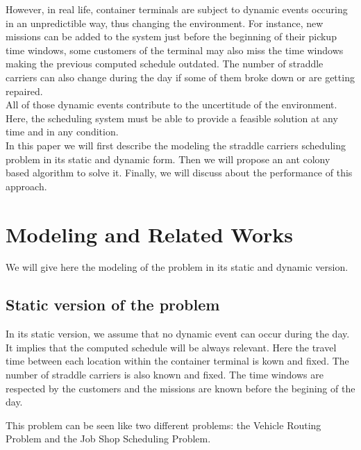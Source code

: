 \documentclass[a4paper,10pt]{article}
\begin{document}
However, in real life, container terminals are subject to dynamic events occuring in an unpredictible way, thus changing the environment. For instance, new missions can be added to the system just before the beginning of their pickup time windows, some customers of the terminal may also miss the time windows making the previous computed schedule outdated. The number of straddle carriers can also change during the day if some of them broke down or are getting repaired.\\

All of those dynamic events contribute to the uncertitude of the environment. Here, the scheduling system must be able to provide a feasible solution at any time and in any condition.\\


In this paper we will first describe the modeling the straddle carriers scheduling problem in its static and dynamic form. Then we will propose an ant colony based algorithm to solve it. Finally, we will discuss about the performance of this approach.

\section{Modeling and Related Works}

We will give here the modeling of the problem in its static and dynamic version.

    \subsection{Static version of the problem}

In its static version, we assume that no dynamic event can occur during the day. It implies that the computed schedule will be always relevant. Here the travel time between each location within the container terminal is kown and fixed. The number of straddle carriers is also known and fixed. The time windows are respected by the customers and the missions are known before the begining of the day.

This problem can be seen like two different problems: the Vehicle Routing Problem and the Job Shop Scheduling Problem.
\end{document}
